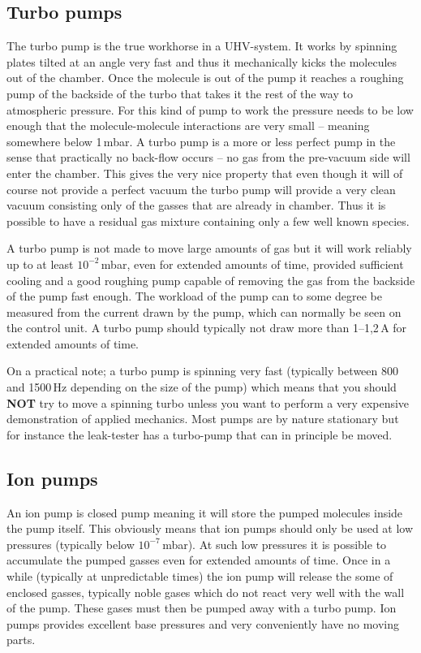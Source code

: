 \documentclass[a4paper,english]{article}
\begin{document}
\subsection{Turbo pumps}
The turbo pump is the true workhorse in a UHV-system. It works by spinning plates tilted at an angle very fast and thus it mechanically kicks the molecules out of the chamber. Once the molecule is out of the pump it reaches a roughing pump of the backside of the turbo that takes it the rest of the way to atmospheric pressure. For this kind of pump to work the pressure needs to be low enough that the molecule-molecule interactions are very small -- meaning somewhere below 1\,mbar. A turbo pump is a more or less perfect pump in the sense that practically no back-flow occurs -- no gas from the pre-vacuum side will enter the chamber. This gives the very nice property that even though it will of course not provide a perfect vacuum the turbo pump will provide a very clean vacuum consisting only of the gasses that are already in chamber. Thus it is possible to have a residual gas mixture containing only a few well known species.

A turbo pump is not made to move large amounts of gas but it will work reliably up to at least $10^{-2}$\,mbar, even for extended amounts of time, provided sufficient cooling and a good roughing pump capable of removing the gas from the backside of the pump fast enough. The workload of the pump can to some degree be measured from the current drawn by the pump, which can normally be seen on the control unit. A turbo pump should typically not draw more than 1--1,2\,A for extended amounts of time.

On a practical note; a turbo pump is spinning very fast (typically between 800 and 1500\,Hz depending on the size of the pump) which means that you should \textbf{NOT} try to move a spinning turbo unless you want to perform a very expensive demonstration of applied mechanics. Most pumps are by nature stationary but for instance the leak-tester has a turbo-pump that can in principle be moved.

\subsection{Ion pumps}
An ion pump is closed pump meaning it will store the pumped molecules inside the pump itself. This obviously means that ion pumps should only be used at low pressures (typically below $10^{-7}$\,mbar). At such low pressures it is possible to accumulate the pumped gasses even for extended amounts of time. Once in a while (typically at unpredictable times) the ion pump will release the some of enclosed gasses, typically noble gases which do not react very well with the wall of the pump. These gases must then be pumped away with a turbo pump. Ion pumps provides excellent base pressures and very conveniently have no moving parts.
\end{document}
